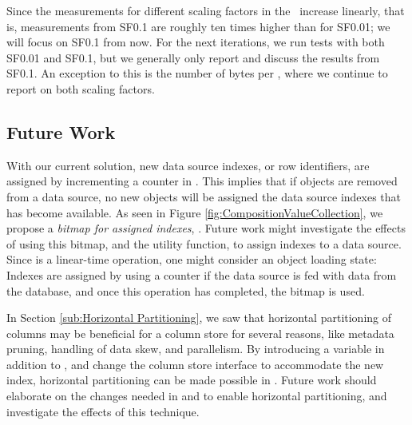 Since the measurements for different scaling factors in the \tpchdl~increase linearly, that is, measurements from SF0.1 are roughly ten times higher than for SF0.01; we will focus on SF0.1 from now. For the next iterations, we run tests with both SF0.01 and SF0.1, but we generally only report and discuss the results from SF0.1. An exception to this is the number of bytes per \lineitem, where we continue to report on both scaling factors.

\subsection{Future Work}
\label{sub:column-store:future-work}
With our current solution, new data source indexes, or row identifiers, are assigned by incrementing a counter in . This implies that if objects are removed from a data source, no new objects will be assigned the data source indexes that has become available. As seen in Figure \ref{fig:CompositionValueCollection}, we propose a \textit{bitmap for assigned indexes}, . Future work might investigate the effects of using this bitmap, and the  utility function, to assign indexes to a data source. Since  is a linear-time operation, one might consider an object loading state: Indexes are assigned by using a counter if the data source is fed with data from the database, and once this operation has completed, the  bitmap is used.

In Section \ref{sub:Horizontal Partitioning}, we saw that horizontal partitioning of columns may be beneficial for a column store for several reasons, like metadata pruning, handling of data skew, and parallelism. By introducing a  variable in addition to , and change the column store interface to accommodate the new index, horizontal partitioning can be made possible in \gap. Future work should elaborate on the changes needed in  and  to enable horizontal partitioning, and investigate the effects of this technique.


